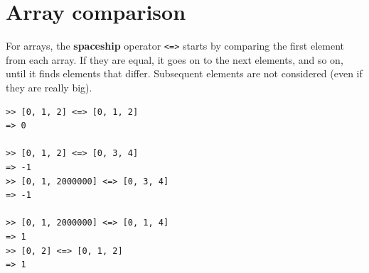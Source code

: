 \documentclass[10pt]{book}
\begin{document}

\section{Array comparison}

For arrays, the {\bf spaceship} operator {\tt <=>} starts
by comparing the first element from each
array.  If they are equal, it goes on to the next elements,
and so on, until it finds elements that differ.  Subsequent
elements are not considered (even if they are really big).

\begin{verbatim}
>> [0, 1, 2] <=> [0, 1, 2]
=> 0

>> [0, 1, 2] <=> [0, 3, 4]
=> -1
>> [0, 1, 2000000] <=> [0, 3, 4]
=> -1

>> [0, 1, 2000000] <=> [0, 1, 4]
=> 1
>> [0, 2] <=> [0, 1, 2]
=> 1
\end{verbatim}
%
\end{document}
